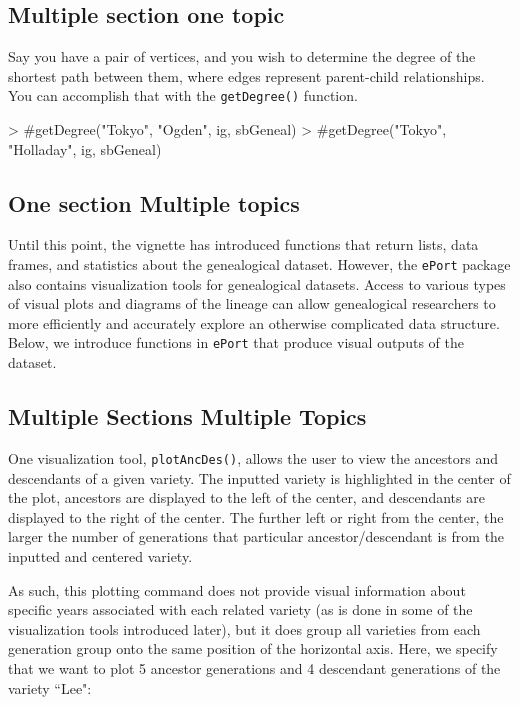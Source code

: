 \documentclass{article}
\numberwithin{equation}{section} %
\newcommand{\pkg}[1]{{\texttt{#1}}}
\begin{document}
\subsection{{Multiple section one topic}}

Say you have a pair of vertices, and you wish to determine the degree of the shortest path between them, where edges represent parent-child relationships. You can accomplish that with the \texttt{getDegree()} function.

\begin{Schunk}
\begin{Sinput}
> #getDegree("Tokyo", "Ogden", ig, sbGeneal)
> #getDegree("Tokyo", "Holladay", ig, sbGeneal)
\end{Sinput}
\end{Schunk}

\subsection{One section Multiple topics}

Until this point, the vignette has introduced functions that return lists, data frames, and statistics about the genealogical dataset. However, the \pkg{ePort} package also contains visualization tools for genealogical datasets. Access to various types of visual plots and diagrams of the lineage can allow genealogical researchers to more efficiently and accurately explore an otherwise complicated data structure. Below, we introduce functions in \pkg{ePort} that produce visual outputs of the dataset.

\subsection{Multiple Sections Multiple Topics}

One visualization tool, \texttt{plotAncDes()}, allows the user to view the ancestors and descendants of a given variety. The inputted variety is highlighted in the center of the plot, ancestors are displayed to the left of the center, and descendants are displayed to the right of the center. The further left or right from the center, the larger the number of generations that particular ancestor/descendant is from the inputted and centered variety.

As such, this plotting command does not provide visual information about specific years associated with each related variety (as is done in some of the visualization tools introduced later), but it does group all varieties from each generation group onto the same position of the horizontal axis. Here, we specify that we want to plot 5 ancestor generations and 4 descendant generations of the variety ``Lee":
\end{document}
